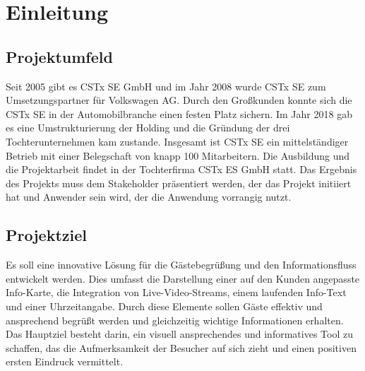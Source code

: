 \section{Einleitung}
\label{sec:Einleitung}


\subsection{Projektumfeld} 
\label{sec:Projektumfeld}
Seit 2005 gibt es \ac{CSTx SE} \ac{GmbH} und im Jahr 2008 wurde \ac{CSTx SE} zum Umsetzungspartner für Volkswagen \ac{AG}.
Durch den Großkunden konnte sich die \ac{CSTx SE} in der Automobilbranche einen festen Platz sichern.
Im Jahr 2018 gab es eine Umstrukturierung der Holding und die Gründung der drei Tochterunternehmen kam zustande.
Insgesamt ist \ac{CSTx SE} ein mittelständiger Betrieb mit einer Belegschaft von knapp 100 Mitarbeitern.
Die Ausbildung und die Projektarbeit findet in der Tochterfirma \ac{CSTx ES} \ac{GmbH} statt.
Das Ergebnis des Projekts muss dem Stakeholder präsentiert werden, der das Projekt initiiert hat und Anwender sein wird, der die Anwendung vorrangig nutzt.


\subsection{Projektziel} 
\label{sec:Projektziel}
Es soll eine innovative Lösung für die Gästebegrüßung und den Informationsfluss entwickelt werden. 
Dies umfasst die Darstellung einer auf den Kunden angepasste Info-Karte, die Integration von Live-Video-Streams, einem laufenden Info-Text und einer Uhrzeitangabe. 
Durch diese Elemente sollen Gäste effektiv und ansprechend begrüßt werden und gleichzeitig wichtige Informationen erhalten. 
Das Hauptziel besteht darin, ein visuell ansprechendes und informatives Tool zu schaffen, das die Aufmerksamkeit der Besucher auf sich zieht und einen positiven ersten Eindruck vermittelt.


